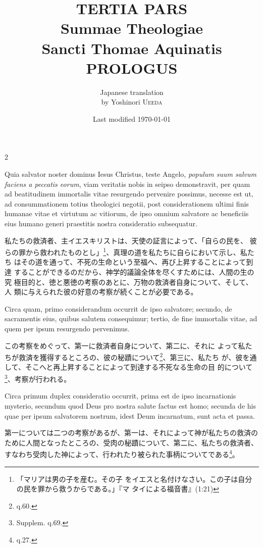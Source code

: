\documentclass[paper=a4paper,fontsize=10pt,jafontsize=9pt,titlepage]{jlreq}
\title{{\bfseries TERTIA PARS}\\{\Huge Summae Theologiae}\\Sancti Thomae
Aquinatis\\{\sffamily PROLOGUS}}
\author{Japanese translation\\by Yoshinori {\scshape Ueeda}}
\date{Last modified \today}
\begin{document}
\maketitle
\pagestyle{fancy}


\begin{paracol}{2}

Quia salvator noster dominus Iesus Christus, teste Angelo, {\itshape populum
suum salvum faciens a peccatis eorum}, viam veritatis nobis in seipso
demonstravit, per quam ad beatitudinem immortalis vitae resurgendo
pervenire possimus, necesse est ut, ad consummationem totius theologici
negotii, post considerationem ultimi finis humanae vitae et virtutum ac
vitiorum, de ipso omnium salvatore ac beneficiis eius humano generi
praestitis nostra consideratio subsequatur.

\switchcolumn

私たちの救済者、主イエスキリストは、天使の証言によって、「自らの民を、
彼らの罪から救われたものとし」\footnote{「マリアは男の子を産む。その子
をイエスと名付けなさい。この子は自分の民を罪から救うからである。」『マ
タイによる福音書』(1:21)}、真理の道を私たちに自らにおいて示し、私たち
はその道を通って、不死の生命という至福へ、再び上昇することによって到達
することができるのだから、神学的議論全体を尽くすためには、人間の生の究
極目的と、徳と悪徳の考察のあとに、万物の救済者自身について、そして、人
類に与えられた彼の好意の考察が続くことが必要である。

\switchcolumn*

Circa quam, primo
considerandum occurrit de ipso salvatore; secundo, de sacramentis eius,
quibus salutem consequimur; tertio, de fine immortalis vitae, ad quem
per ipsum resurgendo pervenimus.

\switchcolumn

この考察をめぐって、第一に救済者自身について、第二に、それに
 よって私たちが救済を獲得するところの、彼の秘蹟について\footnote{q.60.}、第三に、私たち
 が、彼を通して、そこへと再上昇することによって到達する不死なる生命の目
 的について\footnote{Supplem. q.69.}、考察が行われる。

\switchcolumn*

Circa primum duplex consideratio
occurrit, prima est de ipso incarnationis mysterio, secundum quod Deus
pro nostra salute factus est homo; secunda de his quae per ipsum
salvatorem nostrum, idest Deum incarnatum, sunt acta et passa.

\switchcolumn

第一については二つの考察があるが、第一は、それによって神が私たちの救済の
 ために人間となったところの、受肉の秘蹟について、第二に、私たちの救済者、
 すなわち受肉した神によって、行われたり被られた事柄についてである\footnote{q.27.}。

\end{paracol}
\end{document}
